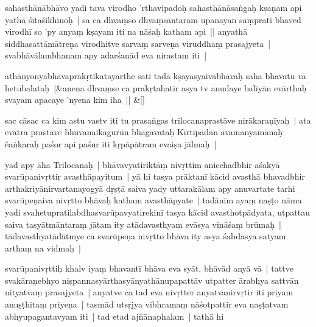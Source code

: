 \documentclass[article,12pt,a4paper]{memoir}%
\newcommand{\persName}[1]{#1}
\newcounter{parCount}
\begin{document}
	  \pstart \leavevmode%
	sahasthānābhāvo yadi tava virodho 'rthavipadoḥ sahasthānāsaṅgaḥ kṣaṇam api yathā śītaśikhinoḥ | sa ca dhvaṃso dhvaṃsāntaram upanayan saṃprati bhaved virodhī so 'py anyaṃ kṣayam iti na nāśaḥ katham api ||  \label{thakur75-121.11} anyathā siddhasattāmātreṇa virodhitve sarvaṃ sarveṇa viruddhaṃ prasajyeta | svabhāvālambhanam apy adarśanād eva nirastam iti |
	{}
	\pend%
      
	    
	    \stanza[\smallbreak]
	  athānyonyābhāvaprakṛtikatayārthe sati tadā kṣayasyaivābhāvaḥ saha bhavatu vā hetubalataḥ |&anena dhvaṃse ca prakṛtahatir asya tv anudaye balīyān evārthaḥ svayam apacaye 'nyena kim iha || \&[\smallbreak]
	  
	  
	  

	  \pstart \leavevmode%
	\label{thakur75-121.17}sac cāsac ca kim astu vastv iti tu prasaṅgas \persName{trilocana}prastāve nirākaraṇīyaḥ | ata evātra prastāve bhuvanaikagurūn bhagavataḥ Kīrtipādān avamanyamānaḥ êaṅkaraḥ paśor api paśur iti kṛpāpātram evaiṣa jālmaḥ |
	{}
	\pend%
      

	  \pstart \leavevmode%
	\label{thakur75-121.20}yad apy āha \persName{Trilocanaḥ} | bhāvavyatiriktāṃ nivṛttim anicchadbhir aśakyā svarūpanivṛttir avasthāpayitum | yā hi tasya prāktanī kācid avasthā bhavadbhir arthakriyānirvartanayogyā dṛṣṭā saiva yady uttarakālam apy anuvartate tarhi svarūpeṇaiva nivṛtto bhāvaḥ katham avasthāpyate | tadānīm ayaṃ naṣṭo nāma yadi svahetupratilabdhasvarūpavyatirekinī tasya kācid avasthotpādyata, utpattau saiva tasyātmāntaraṃ jātam ity atādavasthyam evāsya vināśaṃ brūmaḥ | tādavasthyatādātmye ca svarūpeṇa nivṛtto bhāva ity asya śabdasya satyam arthaṃ na vidmaḥ |
	{}
	\pend%
      

	  \pstart \leavevmode%
	\label{thakur75-121.26}svarūpanivṛttiḥ khalv iyaṃ bhavantī bhāva eva syāt, bhāvād anyā vā | tattve svakāraṇebhyo niṣpannasyārthasyānyathānupapattāv utpatter ārabhya sattvān nityatvaṃ prasajyeta | anyatve ca tad eva nivṛtter anyatvanirvṛtir iti priyam anuṣṭhitaṃ priyeṇa | tasmād utsṛjya vibhramaṃ nāśotpattir eva naṣṭatvam abhyupagantavyam iti | \label{thakur75-122.1} tad etad ajñānaphalam | tathā hi
	{}
	\pend%
      
\end{document}
